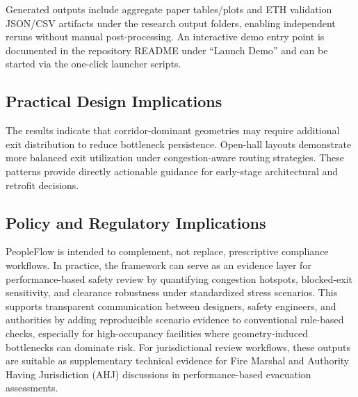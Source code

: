 \documentclass[nolineno]{ieeeaccess}
\begin{document}
Generated outputs include aggregate paper tables/plots and ETH validation JSON/CSV artifacts under the research output folders, enabling independent reruns without manual post-processing. An interactive demo entry point is documented in the repository README under ``Launch Demo'' and can be started via the one-click launcher scripts.

\subsection{Practical Design Implications}
The results indicate that corridor-dominant geometries may require additional exit distribution to reduce bottleneck persistence. Open-hall layouts demonstrate more balanced exit utilization under congestion-aware routing strategies. These patterns provide directly actionable guidance for early-stage architectural and retrofit decisions.

\subsection{Policy and Regulatory Implications}
PeopleFlow is intended to complement, not replace, prescriptive compliance workflows. In practice, the framework can serve as an evidence layer for performance-based safety review by quantifying congestion hotspots, blocked-exit sensitivity, and clearance robustness under standardized stress scenarios. This supports transparent communication between designers, safety engineers, and authorities by adding reproducible scenario evidence to conventional rule-based checks, especially for high-occupancy facilities where geometry-induced bottlenecks can dominate risk.
For jurisdictional review workflows, these outputs are suitable as supplementary technical evidence for Fire Marshal and Authority Having Jurisdiction (AHJ) discussions in performance-based evacuation assessments.
\end{document}
